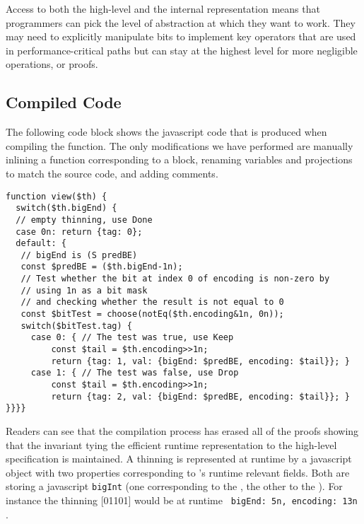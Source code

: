 \documentclass{article}
\begin{document}
Access to both the high-level  and the internal 
representation means that programmers can pick the level of abstraction at which they
want to work.
%
They may need to explicitly manipulate bits to implement key operators that are used
in performance-critical paths but can stay at the highest level for more negligible
operations, or proofs.


\subsection{Compiled Code}

The following code block shows the javascript code that is produced when compiling the
 function.
%
The only modifications we have performed are manually inlining a function
corresponding to a  block, renaming variables and projections
to match the source code, and adding comments.

\begin{verbatim}
function view($th) {
  switch($th.bigEnd) {
  // empty thinning, use Done
  case 0n: return {tag: 0};
  default: {
   // bigEnd is (S predBE)
   const $predBE = ($th.bigEnd-1n);
   // Test whether the bit at index 0 of encoding is non-zero by
   // using 1n as a bit mask
   // and checking whether the result is not equal to 0
   const $bitTest = choose(notEq($th.encoding&1n, 0n));
   switch($bitTest.tag) {
     case 0: { // The test was true, use Keep
         const $tail = $th.encoding>>1n;
         return {tag: 1, val: {bigEnd: $predBE, encoding: $tail}}; }
     case 1: { // The test was false, use Drop
         const $tail = $th.encoding>>1n;
         return {tag: 2, val: {bigEnd: $predBE, encoding: $tail}}; }
}}}}
\end{verbatim}

Readers can see that the compilation process has erased all of the proofs
showing that the invariant tying the efficient runtime representation to the
high-level specification is maintained.
%
A thinning is represented at runtime by a javascript object with two properties
corresponding to 's runtime relevant fields. Both are storing a
javascript \texttt{bigInt} (one corresponding to the , the other
to the ).
%
For instance the thinning [01101] would be at runtime
\texttt{{ bigEnd: 5n, encoding: 13n }}.
%
\end{document}
